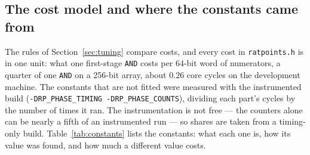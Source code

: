 \documentclass[12pt,a4paper,oneside]{amsart}
\begin{document}
\subsection{The cost model and where the constants came from}\label{app:model}

The rules of Section~\ref{sec:tuning} compare costs, and every cost in
\texttt{ratpoints.h} is in one unit: what one first-stage \texttt{AND} costs
per 64-bit word of numerators, a quarter of one \texttt{AND} on a 256-bit
array, about $0.26$ core cycles on the development machine. The constants
that are not fitted were measured with the instrumented build
(\texttt{-DRP\_PHASE\_TIMING -DRP\_PHASE\_COUNTS}), dividing each part's
cycles by the number of times it ran. The instrumentation is not free ---
the counters alone can be nearly a fifth of an instrumented run --- so shares are
taken from a timing-only build. Table~\ref{tab:constants} lists the
constants: what each one is, how its value was found, and how much a
different value costs.
\end{document}

